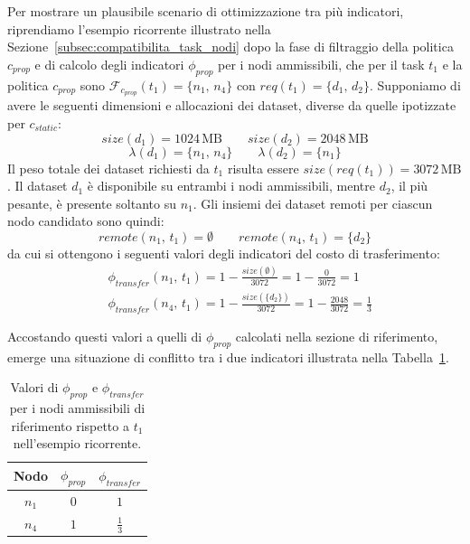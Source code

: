 Per mostrare un plausibile scenario di ottimizzazione tra più indicatori, riprendiamo l'esempio ricorrente illustrato nella Sezione~\ref{subsec:compatibilita_task_nodi} dopo la fase di filtraggio della politica $c_{prop}$ e di calcolo degli indicatori $\phi_{prop}$ per i nodi ammissibili, che per il task $t_1$ e la politica $c_{prop}$ sono $\mathcal{F}_{c_{prop}}(t_1) = \{n_1,\, n_4\}$ con $req(t_1) = \{d_1,\, d_2\}$. Supponiamo di avere le seguenti dimensioni e allocazioni dei dataset, diverse da quelle ipotizzate per $c_{static}$:
\begin{equation}
    size(d_1) = 1024\,\text{MB} \qquad size(d_2) = 2048\,\text{MB}
\end{equation}
\begin{equation}
    \lambda(d_1) = \{n_1,\, n_4\} \qquad \lambda(d_2) = \{n_1\}
\end{equation}
Il peso totale dei dataset richiesti da $t_1$ risulta essere $size\left(req(t_1)\right) = 3072\,\text{MB}$. Il dataset $d_1$ è disponibile su entrambi i nodi ammissibili, mentre $d_2$, il più pesante, è presente soltanto su $n_1$. Gli insiemi dei dataset remoti per ciascun nodo candidato sono quindi:
\begin{equation}
    remote(n_1,\, t_1) = \emptyset
    \qquad
    remote(n_4,\, t_1) = \{d_2\}
\end{equation}
da cui si ottengono i seguenti valori degli indicatori del costo di trasferimento:
\begin{align}
    &\phi_{transfer}(n_1,\, t_1) = 1 - \frac{size(\emptyset)}{3072} = 1 - \frac{0}{3072} = 1 \\[1ex]
    &\phi_{transfer}(n_4,\, t_1) = 1 - \frac{size(\{d_2\})}{3072} = 1 - \frac{2048}{3072} = \frac{1}{3}
\end{align}
 
Accostando questi valori a quelli di $\phi_{prop}$ calcolati nella sezione di riferimento, emerge una situazione di conflitto tra i due indicatori illustrata nella Tabella~\ref{tab:conflitto_indicatori}.

\begin{table}[ht]
    \centering
    \begin{tabular}{ccc}
        \toprule
        \textbf{Nodo} & $\phi_{prop}$ & $\phi_{transfer}$ \\
        \midrule
        $n_1$ & $0$ & $1$ \\
        $n_4$ & $1$ & $\frac{1}{3}$ \\
        \bottomrule
    \end{tabular}
    \caption{Valori di $\phi_{prop}$ e $\phi_{transfer}$ per i nodi ammissibili di riferimento rispetto a $t_1$ nell'esempio ricorrente.}
    \label{tab:conflitto_indicatori}
\end{table}

